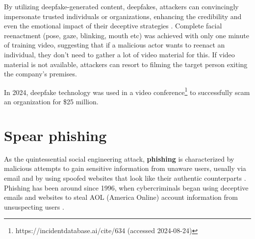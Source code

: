 By utilizing deepfake-generated content, deepfakes, attackers can convincingly impersonate trusted individuals or organizations, enhancing the credibility and even the emotional impact of their deceptive strategies \citep{mirskyTheCreationAndDetectionOfDeepfakes2021}. Complete facial reenactment (pose, gaze, blinking, mouth etc) was achieved with only one minute of training video, suggesting that if a malicious actor wants to reenact an individual, they don't need to gather a lot of video material for this. If video material is not available, attackers can resort to filming the target person exiting the company's premises.

In 2024, deepfake technology was used in a video conference\footnote{https://incidentdatabase.ai/cite/634 (accessed 2024-08-24)} to successfully scam an organization for \$25 million.
















\section{Spear phishing}
\begin{comment}
Phishing & spear phishing

What to cover:
    - What is phishing (via email and ALSO other means)
    - Spear phishing a more targeted form of phishing
    - How ChatGPT can be used to improve scam messages
    - ChatGPT:n eettisten ohjeistusten ohittaminen on jo käsitelty kohdassa Chatbots

\end{comment}

As the quintessential social engineering attack, \textbf{phishing} is characterized by malicious attempts to gain sensitive information from unaware users, usually via email and by using spoofed websites that look like their authentic counterparts \citep{basitComprehensiveSurveyAIenabledPhishingAttacks2021}. Phishing has been around since 1996, when cybercriminals began using deceptive emails and websites to steal AOL (America Online) account information from unsuspecting users \citep{wangDefiningSocialEngineering2020}.


